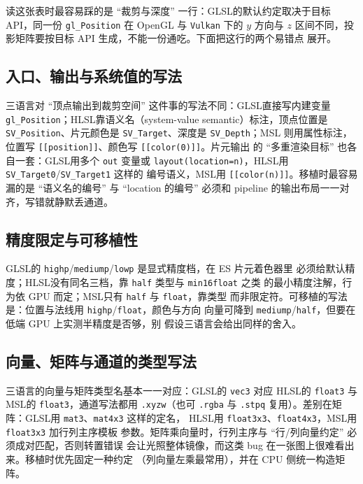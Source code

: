 \documentclass[12pt,a4paper,fontset=fandol]{ctexbook}
\newcommand{\Tp}[1]{\texttt{#1}}
\newcommand{\Bk}{\discretionary{}{}{}}
\newcommand{\Lang}[1]{\textsf{#1}}
\newcommand{\GSL}{\Lang{GLSL}}
\newcommand{\HSL}{\Lang{HLSL}}
\newcommand{\MSL}{\Lang{MSL}}
\begin{document}
读这张表时最容易踩的是 ``裁剪与深度'' 一行：\GSL 的默认约定取决于目标
API，同一份 \Tp{gl\_Position} 在 OpenGL 与 \Tp{Vulkan} 下的 $y$ 方向与 $z$
区间不同，投影矩阵要按目标 API 生成，不能一份通吃。下面把这行的两个易错点
展开。

\subsection{入口、输出与系统值的写法}

三语言对 ``顶点输出到裁剪空间'' 这件事的写法不同：\GSL 直接写内建变量
\Tp{gl\_Position}；\HSL 靠语义名（system-value semantic）标注，顶点位置是
\Tp{SV\_Position}、片元颜色是 \Tp{SV\_Target}、深度是 \Tp{SV\_Depth}；\MSL
则用属性标注，位置写 \Tp{[[position]]}、颜色写 \Tp{[[color(0)]]}。片元输出
的 ``多重渲染目标'' 也各自一套：\GSL 用多个 \Tp{out} 变量或
\Tp{layout(location=n)}，\HSL 用 \Tp{SV\_Target0}/{\Bk}\Tp{SV\_Target1} 这样的
编号语义，\MSL 用 \Tp{[[color(n)]]}。移植时最容易漏的是 ``语义名的编号'' 与
``location 的编号'' 必须和 pipeline 的输出布局一一对齐，写错就静默丢通道。

\subsection{精度限定与可移植性}

\GSL 的 \Tp{highp}/{\Bk}\Tp{mediump}/{\Bk}\Tp{lowp} 是显式精度档，在 ES 片元着色器里
必须给默认精度；\HSL 没有同名三档，靠 \Tp{half} 类型与 \Tp{min16float} 之类
的最小精度注解，行为依 GPU 而定；\MSL 只有 \Tp{half} 与 \Tp{float}，靠类型
而非限定符。可移植的写法是：位置与法线用 \Tp{highp}/{\Bk}\Tp{float}，颜色与方向
向量可降到 \Tp{mediump}/{\Bk}\Tp{half}，但要在低端 GPU 上实测半精度是否够，别
假设三语言会给出同样的舍入。

\subsection{向量、矩阵与通道的类型写法}

三语言的向量与矩阵类型名基本一一对应：\GSL 的 \Tp{vec3} 对应 \HSL 的
\Tp{float3} 与 \MSL 的 \Tp{float3}，通道写法都用 \Tp{.xyzw}（也可 \Tp{.rgba}
与 \Tp{.stpq} 复用）。差别在矩阵：\GSL 用 \Tp{mat3}、\Tp{mat4x3} 这样的定名，
\HSL 用 \Tp{float3x3}、\Tp{float4x3}，\MSL 用 \Tp{float3x3} 加行列主序模板
参数。矩阵乘向量时，行列主序与 ``行/列向量约定'' 必须成对匹配，否则转置错误
会让光照整体镜像，而这类 bug 在一张图上很难看出来。移植时优先固定一种约定
（列向量左乘最常用），并在 CPU 侧统一构造矩阵。
\end{document}
